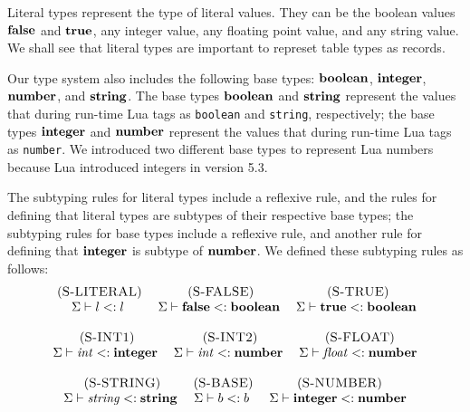 Literal types represent the type of literal values.
They can be the boolean values $\mathbf{false}$ and $\mathbf{true}$,
any integer value, any floating point value, and any string value.
We shall see that literal types are important to represet table types
as records.

Our type system also includes the following base types: $\mathbf{boolean}$,
$\mathbf{integer}$, $\mathbf{number}$, and $\mathbf{string}$.
The base types $\mathbf{boolean}$ and $\mathbf{string}$ represent the values that
during run-time Lua tags as \texttt{boolean} and \texttt{string},
respectively;
the base types $\mathbf{integer}$ and $\mathbf{number}$ represent the values
that during run-time Lua tags as \texttt{number}.
We introduced two different base types to represent Lua numbers
because Lua introduced integers in version 5.3.

The subtyping rules for literal types include a reflexive rule,
and the rules for defining that literal types are subtypes of
their respective base types;
the subtyping rules for base types include a reflexive rule,
and another rule for defining that $\mathbf{integer}$ is subtype of
$\mathbf{number}$.
We defined these subtyping rules as follows:
\[
\begin{array}{c}
\begin{array}{c}
\; (\textsc{S-LITERAL})\\
\Sigma \vdash l <: l
\end{array}
\;
\begin{array}{c}
\; (\textsc{S-FALSE})\\
\Sigma \vdash \mathbf{false} <: \mathbf{boolean}
\end{array}
\;
\begin{array}{c}
\; (\textsc{S-TRUE})\\
\Sigma \vdash \mathbf{true} <: \mathbf{boolean}
\end{array}
\\ \\
\begin{array}{c}
\; (\textsc{S-INT1})\\
\Sigma \vdash {\it int} <: \mathbf{integer}
\end{array}
\;
\begin{array}{c}
\; (\textsc{S-INT2})\\
\Sigma \vdash {\it int} <: \mathbf{number}
\end{array}
\;
\begin{array}{c}
\; (\textsc{S-FLOAT})\\
\Sigma \vdash {\it float} <: \mathbf{number}
\end{array}
\\ \\
\begin{array}{c}
\; (\textsc{S-STRING})\\
\Sigma \vdash {\it string} <: \mathbf{string}
\end{array}
\begin{array}{c}
\; (\textsc{S-BASE})\\
\Sigma \vdash b <: b
\end{array}
\;
\begin{array}{c}
\; (\textsc{S-NUMBER})\\
\Sigma \vdash \mathbf{integer} <: \mathbf{number}
\end{array}
\end{array}
\]

